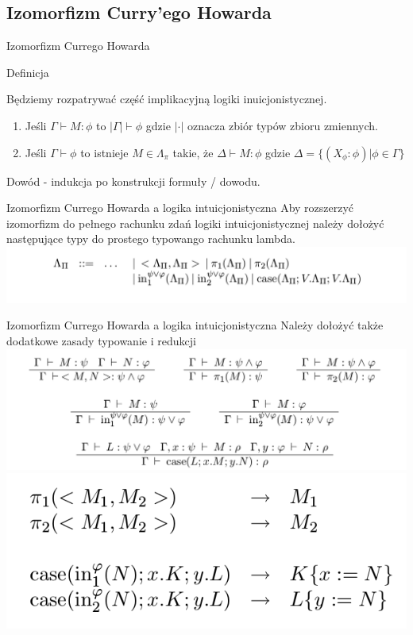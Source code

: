 \documentclass{beamer}
\begin{document}
\subsection{Izomorfizm Curry'ego Howarda}
\begin{frame}{Izomorfizm Currego Howarda}
\begin{block}{Definicja}

Będziemy rozpatrywać część implikacyjną logiki inuicjonistycznej. 
\begin{enumerate}
	\item Jeśli \( \Gamma \vdash M : \phi \) to \( | \Gamma | \vdash \phi \) gdzie \(|\cdot|\) oznacza zbiór typów zbioru zmiennych.
	\item Jeśli \( \Gamma \vdash \phi \) to istnieje \( M \in \Lambda_{\pi}\) takie, że \( \Delta \vdash M : \phi \) gdzie \( \Delta = \{ (X_{\phi} : \phi) | \phi \in \Gamma \} \)
\end{enumerate}
Dowód - indukcja po konstrukcji formuły / dowodu.
\end{block}
\end{frame}

\begin{frame}{Izomorfizm Currego Howarda a logika intuicjonistyczna}
Aby rozszerzyć izomorfizm do pełnego rachunku zdań logiki intuicjonistycznej należy dołożyć następujące typy do prostego typowango rachunku lambda.
\includegraphics[scale=0.25]{types_curry.png}
\end{frame}

\begin{frame}{Izomorfizm Currego Howarda a logika intuicjonistyczna}
Należy dołożyć także dodatkowe zasady typowanie i redukcji
\includegraphics[scale=0.25]{int_curry.png}\\
\includegraphics[scale=0.25]{red_curry.png}
\end{frame}
\end{document}
